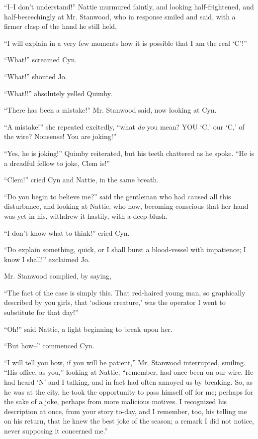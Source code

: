 ``I--I don't understand!'' Nattie murmured faintly, and looking
half-frightened, and half-beseechingly at Mr. Stanwood, who in response
smiled and said, with a firmer clasp of the hand he still held,

``I will explain in a very few moments how it is possible that I am the
real `C'!''

``What!'' screamed Cyn.

``What!'' shouted Jo.

``What!!'' absolutely yelled Quimby.

``There has been a mistake!'' Mr. Stanwood said, now looking at Cyn.

``A mistake!'' she repeated excitedly, ``what \emph{do} you mean? YOU `C,' our
`C,' of the wire? Nonsense! You are joking!''

``Yes, he is joking!'' Quimby reiterated, but his teeth chattered as he
spoke. ``He is a dreadful fellow to joke, Clem is!''

``Clem!'' cried Cyn and Nattie, in the same breath.

``Do you begin to believe me?'' said the gentleman who had caused all this
disturbance, and looking at Nattie, who now, becoming conscious that her
hand was yet in his, withdrew it hastily, with a deep blush.

``I don't know what to think!'' cried Cyn.

``Do explain something, quick, or I shall burst a blood-vessel with
impatience; I know I shall!'' exclaimed Jo.

Mr. Stanwood complied, by saying,

``The fact of the case is simply this. That red-haired young man, so
graphically described by you girls, that `odious creature,' was the
operator I went to substitute for that day!''

``Oh!'' said Nattie, a light beginning to break upon her.

``But how--'' commenced Cyn.

``I will tell you how, if you will be patient,'' Mr. Stanwood interrupted,
smiling. ``His office, as you,'' looking at Nattie, ``remember, had once
been on our wire. He had heard `N' and I talking, and in fact had often
annoyed us by breaking. So, as he was at the city, he took the
opportunity to pass himself off for me; perhaps for the sake of a joke,
perhaps from more malicious motives. I recognized his description at
once, from your story to-day, and I remember, too, his telling me on his
return, that he knew the best joke of the season; a remark I did not
notice, never supposing it concerned me.''

